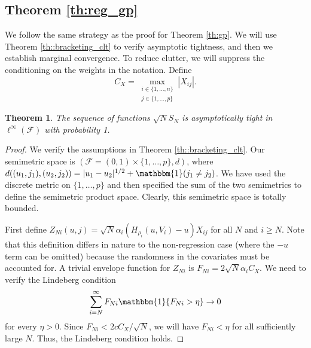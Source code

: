 \documentclass[11pt,a4paper]{article}
\newtheorem{thm}{Theorem}
\begin{document}
\begin{appendices}
\subsection{Theorem \ref{th:reg_gp}}

We follow the same strategy as the proof for {Theorem \ref{th:gp}}. We will use {Theorem \ref{th::bracketing_clt}} to verify asymptotic tightness, and then we establish marginal convergence. To reduce clutter, we will suppress the conditioning on the weights in the notation. Define
\begin{equation*}
    C_{X} = \max_{\substack{i \in \{1,\ldots, n\}\\j \in \{1, \ldots, p\}}}|X_{ij}|.
\end{equation*}

\begin{thm}\label{th:tight}
The sequence of functions $\sqrt{N}S_N$ is  asymptotically tight in $\ell^{\infty}(\mathcal{F})$ with probability 1.
\end{thm}
\begin{proof}
    We verify the assumptions in {Theorem \ref{th::bracketing_clt}}. Our semimetric space is $(\mathcal{F} = (0,1)\times \{1,\ldots, p\}, d)$, where $d((u_{1},j_{1}),(u_{2},j_{2})) = |u_{1}-u_{2}|^{1/2} + \mathbbm{1}(j_{1} \neq j_{2})$. We have used the discrete metric on $\{1,\ldots, p\}$ and then specified the sum of the two semimetrics to define the semimetric product space. Clearly, this semimetric space is totally bounded.

First define $Z_{Ni}(u, j) = \sqrt{N}\alpha_{i}(H_{\rho_{i}}(u,V_{i})-u)X_{ij}$ for all $N$ and $i \geq N$. Note that this definition differs in nature to the non-regression case (where the $-u$ term can be omitted) because the randomness in the covariates must be accounted for. A trivial envelope function for $Z_{Ni}$ is $F_{Ni} = 2\sqrt{N}\alpha_{i}C_{X}$. We need to verify the Lindeberg condition
\begin{equation*}
    \sum_{i=N}^{\infty} F_{Ni}\mathbbm{1}\{F_{Ni} > \eta\} \rightarrow 0
\end{equation*}
for every $\eta > 0$. Since $F_{Ni} < 2cC_{X}/\sqrt{N}$, we will have $F_{Ni} < \eta$ for all sufficiently large $N$. Thus, the Lindeberg condition holds.


\end{proof}
\end{appendices}
\end{document}
